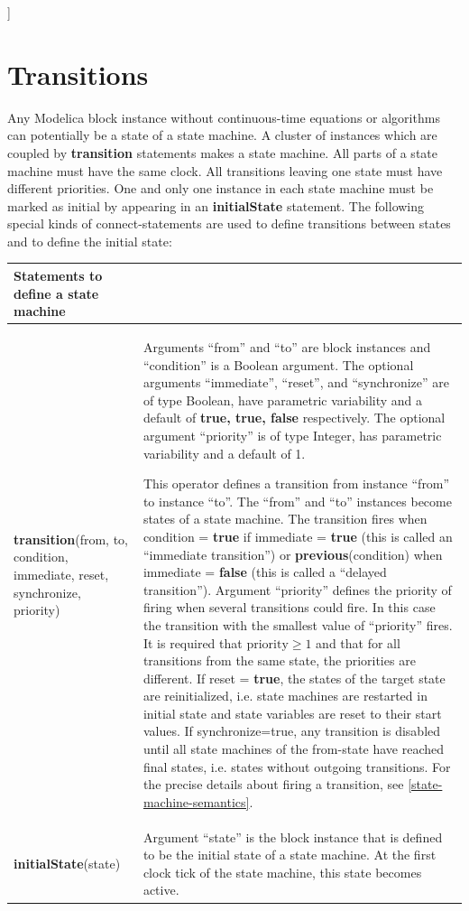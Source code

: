 \documentclass[10pt,a4paper]{report}
\def\doublelabel#1{\label{#1}\hypertarget{#1}{}}
\begin{document}
{]}

\section{Transitions}\doublelabel{transitions}

Any Modelica block instance without continuous-time equations or
algorithms can potentially be a state of a state machine. A cluster of
instances which are coupled by \textbf{transition} statements makes a
state machine. All parts of a state machine must have the same clock.
All transitions leaving one state must have different priorities. One
and only one instance in each state machine must be marked as initial by
appearing in an \textbf{initialState} statement. The following special
kinds of connect-statements are used to define transitions between
states and to define the initial state:

\begin{longtable}[]{@{}ll@{}}
\hline
\textbf{Statements to define a state machine}\\ \hline
\endhead
\textbf{transition}(from, to, condition,\newline
immediate, reset,\newline
synchronize, priority)
&
Arguments ``from'' and ``to'' are block instances and ``condition'' is a
Boolean argument. The optional arguments ``immediate'', ``reset'', and
``synchronize'' are of type Boolean, have parametric variability and a
default of \textbf{true, true, false} respectively. The optional
argument ``priority'' is of type Integer, has parametric variability and
a default of 1.

This operator defines a transition from instance ``from'' to instance
``to''. The ``from'' and ``to'' instances become states of a state
machine. The transition fires when condition = \textbf{true} if
immediate = \textbf{true} (this is called an ``immediate transition'')
or \textbf{previous}(condition) when immediate = \textbf{false} (this is
called a ``delayed transition''). Argument ``priority'' defines the
priority of firing when several transitions could fire. In this case the
transition with the smallest value of ``priority'' fires. It is required
that $\textrm{priority}\ge 1$ and that for all transitions from the same state, the
priorities are different. If reset = \textbf{true}, the states of the
target state are reinitialized, i.e. state machines are restarted in
initial state and state variables are reset to their start values. If
synchronize=true, any transition is disabled until all state machines of
the from-state have reached final states, i.e. states without outgoing
transitions. For the precise details about firing a transition, see
\ref{state-machine-semantics}.\\ \hline
\textbf{initialState}(state) & Argument ``state'' is the block instance
that is defined to be the initial state of a state machine. At the first
clock tick of the state machine, this state becomes
active.\\ \hline
\end{longtable}
\end{document}
